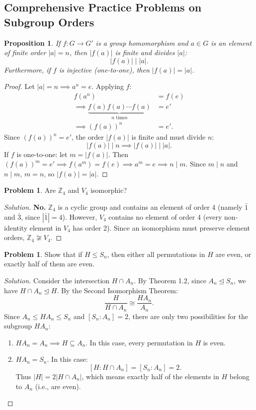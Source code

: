 \documentclass[12pt]{article}
\theoremstyle{definition}
\newtheorem{problem}[definition]{Problem}
\theoremstyle{plain}
\newtheorem{proposition}[theorem]{Proposition}
\begin{document}
\subsection{Comprehensive Practice Problems on Subgroup Orders}

\begin{proposition}
If $f: G \to G'$ is a group homomorphism and $a \in G$ is an element of finite order $|a| = n$, then $|f(a)|$ is finite and divides $|a|$:
\[
|f(a)| \mid |a|.
\]
Furthermore, if $f$ is injective (one-to-one), then $|f(a)| = |a|$.
\end{proposition}

\begin{proof}
Let $|a| = n \implies a^n = e$.
Applying $f$:
\begin{align*}
f(a^n) &= f(e) \\
\implies \underbrace{f(a) f(a) \cdots f(a)}_{n \text{ times}} &= e' \\
\implies (f(a))^n &= e'.
\end{align*}
Since $(f(a))^n = e'$, the order $|f(a)|$ is finite and must divide $n$:
\[
|f(a)| \mid n \implies |f(a)| \mid |a|.
\]
If $f$ is one-to-one: let $m = |f(a)|$. Then $(f(a))^m = e' \implies f(a^m) = f(e) \implies a^m = e \implies n \mid m$. Since $m \mid n$ and $n \mid m$, $m = n$, so $|f(a)| = |a|$.
\end{proof}

\begin{problem}
Are $\mathbb{Z}_4$ and $V_4$ isomorphic?
\end{problem}
\begin{proof}[Solution]
\textbf{No.}
$\mathbb{Z}_4$ is a cyclic group and contains an element of order 4 (namely $\bar{1}$ and $\bar{3}$, since $|\bar{1}| = 4$).
However, $V_4$ contains no element of order 4 (every non-identity element in $V_4$ has order 2).
Since an isomorphism must preserve element orders, $\mathbb{Z}_4 \not\cong V_4$.
\end{proof}

\begin{problem}
Show that if $H \le S_n$, then either all permutations in $H$ are even, or exactly half of them are even.
\end{problem}
\begin{proof}[Solution]
Consider the intersection $H \cap A_n$.
By Theorem 1.2, since $A_n \trianglelefteq S_n$, we have $H \cap A_n \trianglelefteq H$.
By the Second Isomorphism Theorem:
\[
\frac{H}{H \cap A_n} \cong \frac{H A_n}{A_n}.
\]
Since $A_n \le H A_n \le S_n$ and $[S_n : A_n] = 2$, there are only two possibilities for the subgroup $H A_n$:
\begin{enumerate}
    \item $H A_n = A_n \implies H \subseteq A_n$. In this case, every permutation in $H$ is even.
    \item $H A_n = S_n$. In this case:
    \[
    [H : H \cap A_n] = [S_n : A_n] = 2.
    \]
    Thus $|H| = 2 |H \cap A_n|$, which means exactly half of the elements in $H$ belong to $A_n$ (i.e., are even).
\end{enumerate}
\end{proof}
\end{document}
